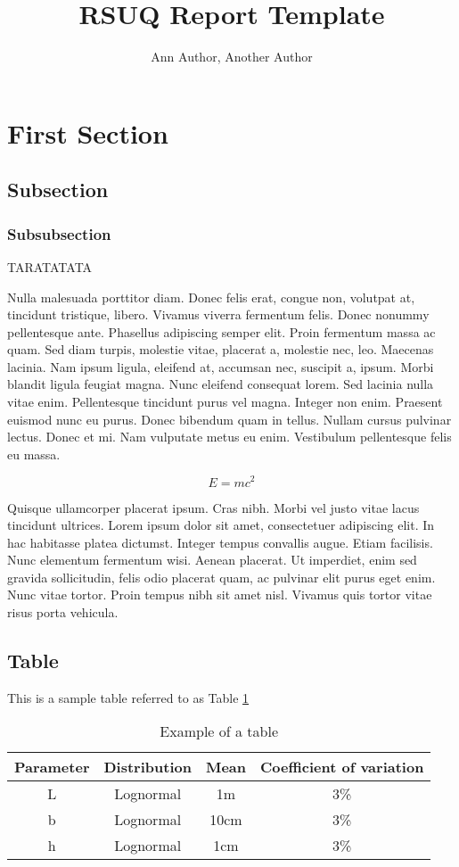 \documentclass{rsuqreport}
\title{RSUQ Report Template}
\author{Ann Author, Another Author}
\begin{document}
\section{First Section}
\subsection{Subsection}
\subsubsection{Subsubsection}
TARATATATA

Nulla malesuada porttitor diam. Donec felis erat, congue non, volutpat
at, tincidunt tristique, libero. Vivamus viverra fermentum felis.
Donec nonummy pellentesque ante. Phasellus adipiscing semper elit.
Proin fermentum massa ac quam. Sed diam turpis, molestie vitae,
placerat a, molestie nec, leo. Maecenas lacinia. Nam ipsum ligula,
eleifend at, accumsan nec, suscipit a, ipsum. Morbi blandit ligula
feugiat magna. Nunc eleifend consequat lorem. Sed lacinia nulla vitae
enim. Pellentesque tincidunt purus vel magna.  Integer non enim.
Praesent euismod nunc eu purus. Donec bibendum quam in tellus.  Nullam
cursus pulvinar lectus. Donec et mi. Nam vulputate metus eu enim.
Vestibulum pellentesque felis eu massa.

\begin{equation}
E = mc^2
\label{eqn: Einstein}
\end{equation}

Quisque ullamcorper placerat ipsum. Cras nibh. Morbi vel justo vitae
lacus tincidunt ultrices. Lorem ipsum dolor sit amet, consectetuer
adipiscing elit. In hac habitasse platea dictumst. Integer tempus
convallis augue. Etiam facilisis.  Nunc elementum fermentum wisi.
Aenean placerat. Ut imperdiet, enim sed gravida sollicitudin, felis
odio placerat quam, ac pulvinar elit purus eget enim. Nunc vitae
tortor. Proin tempus nibh sit amet nisl. Vivamus quis tortor vitae
risus porta vehicula.



\subsection{Table}
This is a sample table referred to as Table \ref{table: random variables}
\begin{table}[h]
	\centering

	\begin{tabular}{cccc}
		\hline
		Parameter & Distribution & Mean & Coefficient of variation \\ \hline
		    L     &  Lognormal   &  1m  &           3\%            \\
		    b     &  Lognormal   & 10cm &           3\%            \\
		    h     &  Lognormal   & 1cm  &           3\%            \\ \hline
	\end{tabular}
	\caption{Example of a table}
	\label{table: random variables}
	
\end{table}
\end{document}

